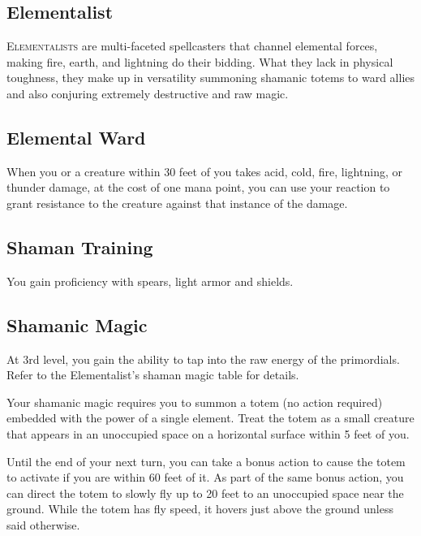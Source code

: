
\begin{multicols*}{2}

\section{Elementalist}

\lettrine[lines=3, lhang=0.15, loversize=0.25, findent=.5em]{E}{lementalists} are multi-faceted spellcasters that channel elemental forces, making fire, earth, and lightning do their bidding. What they lack in physical toughness, they make up in versatility summoning shamanic totems to ward allies and also conjuring extremely destructive and raw magic.

\subsection*{Elemental Ward}

When you or a creature within 30 feet of you takes acid, cold, fire, lightning, or thunder damage, at the cost of one mana point, you can use your reaction to grant resistance to the creature against that instance of the damage.



\subsection*{Shaman Training}

You gain proficiency with spears, light armor and shields.

\subsection*{Shamanic Magic}

At 3rd level, you gain the ability to tap into the raw energy of the primordials. Refer to the Elementalist's shaman magic table for details.

Your shamanic magic requires you to summon a totem (no action required) embedded with the power of a single element. Treat the totem as a small creature that appears in an unoccupied space on a horizontal surface within 5 feet of you.

Until the end of your next turn, you can take a bonus action to cause the totem to activate if you are within 60 feet of it. As part of the same bonus action, you can direct the totem to slowly fly up to 20 feet to an unoccupied space near the ground. While the totem has fly speed, it hovers just above the ground unless said otherwise.


\end{multicols*}
